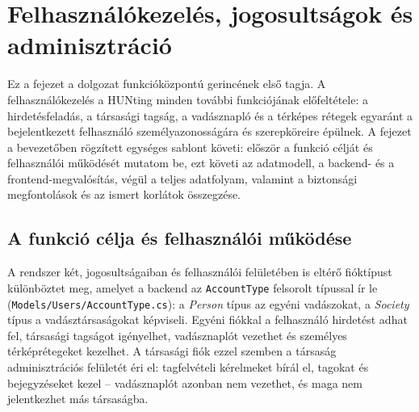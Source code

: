 
\chapter{Felhasználókezelés, jogosultságok és adminisztráció}
\label{chap:felhasznalok}

Ez a fejezet a dolgozat funkcióközpontú gerincének első tagja. A felhasználókezelés a HUNting
minden további funkciójának előfeltétele: a hirdetésfeladás, a társasági tagság, a vadásznapló és
a térképes rétegek egyaránt a bejelentkezett felhasználó személyazonosságára és szerepköreire
épülnek. A fejezet a bevezetőben rögzített egységes sablont követi: először a funkció célját és
felhasználói működését mutatom be, ezt követi az adatmodell, a backend- és a frontend-megvalósítás,
végül a teljes adatfolyam, valamint a biztonsági megfontolások és az ismert korlátok összegzése.

\section{A funkció célja és felhasználói működése}
\label{sec:users-cel}

A rendszer két, jogosultságaiban és felhasználói felületében is eltérő fióktípust különböztet meg,
amelyet a backend az \texttt{AccountType} felsorolt típussal ír le
(\texttt{Models/Users/AccountType.cs}): a \emph{Person} típus az egyéni vadászokat, a
\emph{Society} típus a vadásztársaságokat képviseli. Egyéni fiókkal a felhasználó hirdetést adhat
fel, társasági tagságot igényelhet, vadásznaplót vezethet és személyes térképrétegeket kezelhet.
A társasági fiók ezzel szemben a társaság adminisztrációs felületét éri el: tagfelvételi kérelmeket
bírál el, tagokat és bejegyzéseket kezel -- vadásznaplót azonban nem vezethet, és maga nem
jelentkezhet más társaságba.

